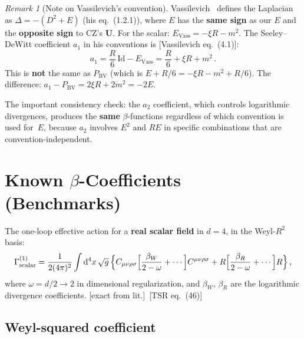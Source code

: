 \documentclass[12pt,a4paper]{article}
\theoremstyle{definition}
\theoremstyle{remark}
\newtheorem{remark}[proposition]{Remark}
\newcommand{\dd}{\mathrm{d}}
\newcommand{\Id}{\mathrm{Id}}
\newcommand{\fromlit}[1]{\textcolor{blue!70!black}{\textsf{[#1]}}}
\newcommand{\exactlit}{\textcolor{blue!60!black}{\textsf{[exact from lit.]}}}
\begin{document}
\begin{remark}[Note on Vassilevich's convention]
\label{rem:vassilevich-sign}
Vassilevich~\cite{Vassilevich2003} defines the Laplacian as
$\Delta = -(D^2 + E)$ (his eq.~(1.2.1)), where $E$ has the
\textbf{same sign} as our $E$ and the \textbf{opposite sign} to
CZ's $\mathbf{U}$.  For the scalar: $E_{\mathrm{Vass}} = -\xi R - m^2$.
The Seeley--DeWitt coefficient $a_1$ in his conventions is
\fromlit{Vassilevich eq.~(4.1)}:
\begin{equation}
  a_1 = \frac{R}{6}\,\Id - E_{\mathrm{Vass}}
  = \frac{R}{6} + \xi R + m^2\,.
  \label{eq:Vass-a1}
\end{equation}
This is \textbf{not} the same as $P_{\mathrm{BV}}$ (which is
$E + R/6 = -\xi R - m^2 + R/6$). The difference:
$a_1 - P_{\mathrm{BV}} = 2\xi R + 2m^2 = -2E$.

The important consistency check: the $a_2$ coefficient, which
controls logarithmic divergences, produces the \textbf{same}
$\beta$-functions regardless of which convention is used for~$E$,
because $a_2$ involves $E^2$ and $RE$ in specific combinations
that are convention-independent.
\end{remark}


\section{Known $\beta$-Coefficients (Benchmarks)}
\label{sec:beta}

The one-loop effective action for a \textbf{real scalar field}
in $d=4$, in the Weyl-$R^2$ basis:
\begin{equation}
  \Gamma^{(1)}_{\mathrm{scalar}}
  = \frac{1}{2(4\pi)^2}\int \dd^4 x\,\sqrt{g}\,\Bigl\{
    C_{\mu\nu\rho\sigma}\Bigl[
      \frac{\beta_W}{2-\omega} + \cdots
    \Bigr]C^{\mu\nu\rho\sigma}
    + R\Bigl[
      \frac{\beta_R}{2-\omega} + \cdots
    \Bigr]R
  \Bigr\}\,,
  \label{eq:effective-action-structure}
\end{equation}
where $\omega = d/2 \to 2$ in dimensional regularization, and
$\beta_W$, $\beta_R$ are the logarithmic divergence coefficients.
\exactlit\ \fromlit{TSR eq.~(46)}

\subsection{Weyl-squared coefficient}
\end{document}
